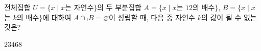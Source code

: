 전체집합 $U=\{x \mid x$는 자연수$\}$의 두 부분집합 $A=\{x \mid x$는 $12$의 배수$\}$, $B=\{x \mid x$는 $k$의 배수$\}$에 대하여 $A\cap\comp{B}=\varnothing$이 성립할 때, 다음 중 자연수 $k$의 값이 될 수 \underline{없는} 것은?
\begin{choices32}{$2$}{$3$}{$4$}{$6$}{$8$}\end{choices32}
